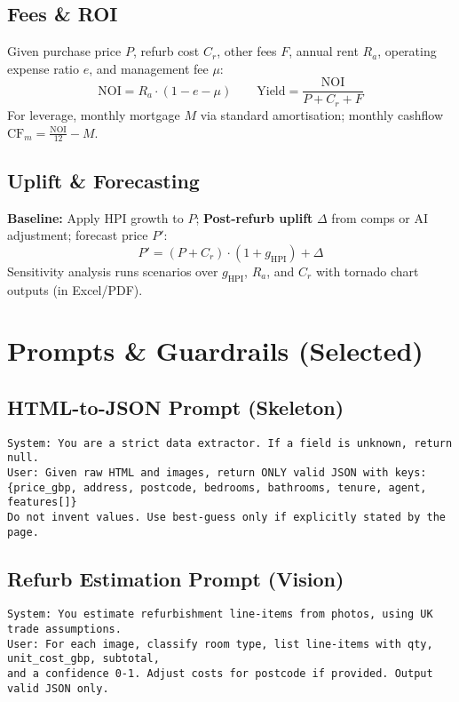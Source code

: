 \documentclass[12pt,a4paper]{article}
\begin{document}
\subsection{Fees \& ROI}
Given purchase price $P$, refurb cost $C_r$, other fees $F$, annual rent $R_a$, operating expense ratio $e$, and management fee $\mu$:
\[
\text{NOI} = R_a\cdot(1-e-\mu)
\qquad
\text{Yield} = \frac{\text{NOI}}{P + C_r + F}
\]
For leverage, monthly mortgage $M$ via standard amortisation; monthly cashflow $\text{CF}_m = \frac{\text{NOI}}{12} - M$.

\subsection{Uplift \& Forecasting}
\textbf{Baseline:} Apply HPI growth to $P$; \textbf{Post-refurb uplift} $\Delta$ from comps or AI adjustment; forecast price $P'$:
\[
P' = (P + C_r)\cdot(1 + g_{\text{HPI}}) + \Delta
\]
Sensitivity analysis runs scenarios over $g_{\text{HPI}}$, $R_a$, and $C_r$ with tornado chart outputs (in Excel/PDF).

\section{Prompts \& Guardrails (Selected)}
\subsection{HTML-to-JSON Prompt (Skeleton)}
\begin{lstlisting}
System: You are a strict data extractor. If a field is unknown, return null.
User: Given raw HTML and images, return ONLY valid JSON with keys:
{price_gbp, address, postcode, bedrooms, bathrooms, tenure, agent, features[]}
Do not invent values. Use best-guess only if explicitly stated by the page.
\end{lstlisting}

\subsection{Refurb Estimation Prompt (Vision)}
\begin{lstlisting}
System: You estimate refurbishment line-items from photos, using UK trade assumptions.
User: For each image, classify room type, list line-items with qty, unit_cost_gbp, subtotal,
and a confidence 0-1. Adjust costs for postcode if provided. Output valid JSON only.
\end{lstlisting}
\end{document}
